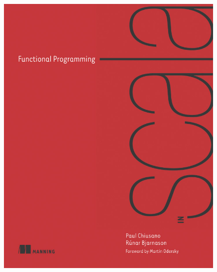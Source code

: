 \documentclass{beamer}
\begin{document}
\begin{frame}
\begin{columns}[c]
    \begin{figure}
        \vspace{10ex}
        \centering
        \includegraphics[width=\textwidth]{functional-programming-in-scala.png}
    \end{figure}
  \end{columns}
\end{frame}

\end{document}
